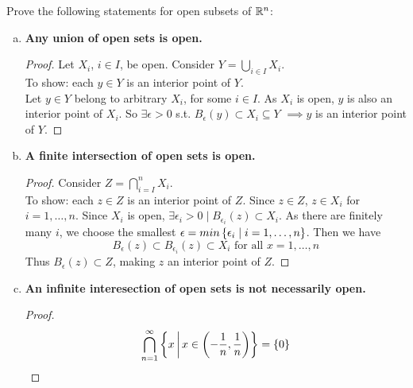  Prove the following statements for open subsets of $\mathbb{R}^n$:
\begin{enumerate}[a.]
  \item \textbf{Any union of open sets is open.} \\
  \begin{proof}
    Let $X_i$, $i \in I$, be open. Consider $Y = \bigcup_{i\in I}X_i$. \\
    To show: each $y \in Y$ is an interior point of $Y$. \\
    Let $y\in Y$ belong to arbitrary $X_i$, for some $i\in I$. As $X_i$ is open, $y$ is also an interior point of $X_i$. So $\exists \epsilon > 0$ s.t. $B_\epsilon (y) \subset X_i \subseteq Y$ $\implies y$ is an interior point of $Y$.
  \end{proof}
  \item \textbf{A finite intersection of open sets is open.} \\
  \begin{proof}
    Consider $Z = \bigcap^n_{i=I}X_i$. \\
    To show: each $z\in Z$ is an interior point of $Z$. Since $z\in Z$, $z\in X_i$ for $i=1,\dots,n$. Since $X_i$ is open, $\exists\epsilon_i > 0 \mid B_{\epsilon_i}(z) \subset X_i$. As there are finitely many $i$, we choose the smallest $\epsilon=min\left\{ \epsilon_i \mid i = 1,\dots,n \right\}$. Then we have
    \[B_\epsilon (z) \subset B_{\epsilon_i}(z) \subset X_i \text{ for all } x=1,\dots,n\]
    Thus $B_\epsilon (z)\subset Z$, making $z$ an interior point of $Z$.
  \end{proof}

  \item\textbf{An infinite interesection of open sets is not necessarily open.}
  \begin{proof}
    \[\bigcap_{n=1}^{\infty} \left\{ x \,\middle\vert\, x\in \left(-\frac{1}{n}, \frac{1}{n}\right) \right\}=\left\{ 0 \right\}\]
  \end{proof}
\end{enumerate}
